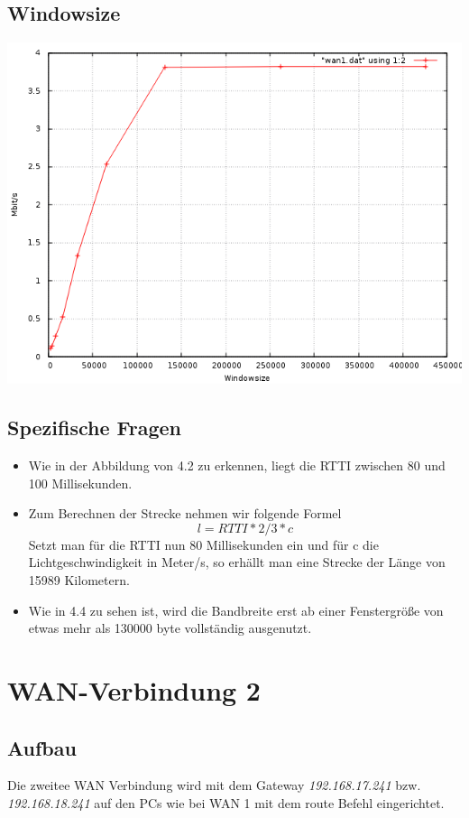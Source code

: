 \documentclass[a4paper,10pt]{article}
\begin{document}
\subsection{Windowsize}
\includegraphics[scale=0.75]{wan1_windows.png}

\subsection{Spezifische Fragen}
\begin{itemize}
 \item Wie in der Abbildung von 4.2 zu erkennen, liegt die RTTI zwischen 80 und 100 Millisekunden.
 \item {Zum Berechnen der Strecke nehmen wir folgende Formel
 \begin{equation}
  l=RTTI*2/3*c
 \end{equation}
 Setzt man für die RTTI nun 80 Millisekunden ein und für c die Lichtgeschwindigkeit in Meter/s,
 so erhällt man eine Strecke der Länge von 15989 Kilometern.}
 \item Wie in 4.4 zu sehen ist, wird die Bandbreite erst ab einer Fenstergröße von etwas mehr als 130000 byte vollständig ausgenutzt.
\end{itemize}

\section{WAN-Verbindung 2}

\subsection{Aufbau}
Die zweitee WAN Verbindung wird mit dem Gateway \textit{192.168.17.241} bzw. \textit{192.168.18.241} auf den PCs wie bei WAN 1 mit dem route Befehl eingerichtet.
\end{document}
